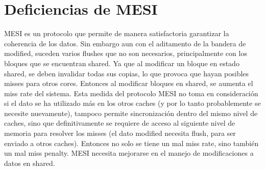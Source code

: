 \documentclass {article}
\begin{document}
\section{Deficiencias de MESI}

MESI es un protocolo que permite de manera satisfactoria garantizar la coherencia de los datos. Sin
embargo aun con el aditamento de la bandera de modified, suceden varios flushes que no son
necesarios, principalmente con los bloques que se encuentran shared. Ya que al modificar un bloque
en estado shared, se deben invalidar todas sus copias, lo que provoca que hayan posibles misses
para otros cores. Entonces al modificar bloques en shared, se aumenta el miss rate del sistema. Esta
medida del protocolo MESI no toma en consideración si el dato se ha utilizado más en
los otros caches (y por lo tanto probablemente se necesite nuevamente), tampoco permite
sincronización dentro del mismo nivel de caches, sino que definitivamente se requiere de acceso al siguiente nivel
de memoria para resolver los misses (el dato modified necesita flush, para ser enviado a otros
caches). Entonces no solo se tiene un mal miss rate, sino también un mal miss penalty. MESI necesita
mejorarse en el manejo de modificaciones a datos en shared.  
\end{document}
